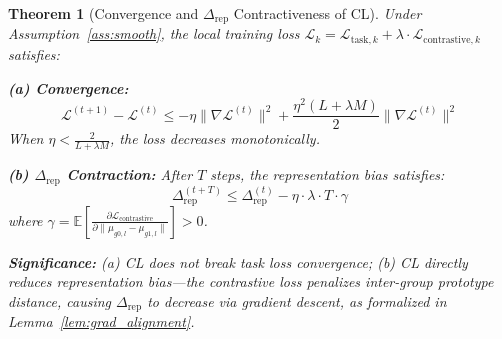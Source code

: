 \documentclass[11pt]{article}
\newtheorem{theorem}{Theorem}
\begin{document}
\begin{theorem}[Convergence and $\Delta_{\mathrm{rep}}$ Contractiveness of CL]
\label{thm:cl_convergence}
Under Assumption~\ref{ass:smooth}, the local training loss $\mathcal{L}_k = \mathcal{L}_{\mathrm{task},k} + \lambda \cdot \mathcal{L}_{\mathrm{contrastive},k}$ satisfies:

\textbf{(a) Convergence:}
$$\mathcal{L}^{(t+1)} - \mathcal{L}^{(t)} \leq -\eta \|\nabla \mathcal{L}^{(t)}\|^2 + \frac{\eta^2 (L + \lambda M)}{2} \|\nabla \mathcal{L}^{(t)}\|^2$$
When $\eta < \frac{2}{L + \lambda M}$, the loss decreases monotonically.

\textbf{(b) $\Delta_{\mathrm{rep}}$ Contraction:}
After $T$ steps, the representation bias satisfies:
$$\Delta_{\mathrm{rep}}^{(t+T)} \leq \Delta_{\mathrm{rep}}^{(t)} - \eta \cdot \lambda \cdot T \cdot \gamma$$
where $\gamma = \mathbb{E}\left[\frac{\partial \mathcal{L}_{\mathrm{contrastive}}}{\partial \|\mu_{g0,l} - \mu_{g1,l}\|}\right] > 0$.

\textbf{Significance:} (a) CL does not break task loss convergence; (b) CL directly reduces representation bias---the contrastive loss penalizes inter-group prototype distance, causing $\Delta_{\mathrm{rep}}$ to decrease via gradient descent, as formalized in Lemma~\ref{lem:grad_alignment}.
\end{theorem}
\end{document}
